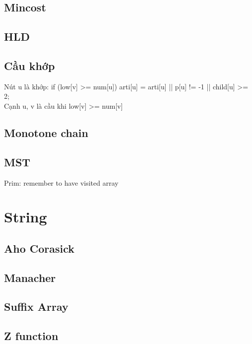 \documentclass[A4 paper, 12pt, oneside]{article}
\begin{document}
\begin{multicols}{2}
	\subsection{Mincost}
	
	
	\subsection{HLD}
	
	
	\subsection{Cầu khớp}
Nút u là khớp: 
if (low[v] >= num[u]) arti[u] = arti[u] || p[u] != -1 || child[u] >= 2;\\
Cạnh u, v là cầu khi low[v] >= num[v]
	\subsection{Monotone chain}
	

	\subsection{MST}
	Prim: remember to have visited array
	
\section{String}
	\subsection{Aho Corasick}
	
	
	\subsection{Manacher}
	
	
	\subsection{Suffix Array}
	
	
	\subsection{Z function}
	
	

\end{multicols}
\end{document}
